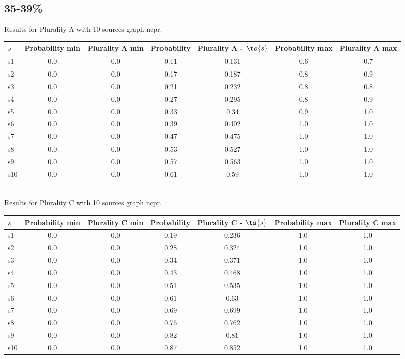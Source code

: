 \documentclass{article}
\begin{document}
\newpage

\subsection{35-39\%}

\noindent Results for Plurality A with 10 sources graph ncpr.

\noindent\begin{tabular}{|l|c|c|c|c|c|c|}
\hline
$s$& Probability min & Plurality A min & Probability & Plurality A - $\ts{s}$ & Probability max & Plurality A max\\
\hline
s1 &0.0 & 0.0 & 0.11 & 0.131 & 0.6 & 0.7\\
\hline
s2 &0.0 & 0.0 & 0.17 & 0.187 & 0.8 & 0.9\\
\hline
s3 &0.0 & 0.0 & 0.21 & 0.232 & 0.8 & 0.8\\
\hline
s4 &0.0 & 0.0 & 0.27 & 0.295 & 0.8 & 0.9\\
\hline
s5 &0.0 & 0.0 & 0.33 & 0.34 & 0.9 & 1.0\\
\hline
s6 &0.0 & 0.0 & 0.39 & 0.402 & 1.0 & 1.0\\
\hline
s7 &0.0 & 0.0 & 0.47 & 0.475 & 1.0 & 1.0\\
\hline
s8 &0.0 & 0.0 & 0.53 & 0.527 & 1.0 & 1.0\\
\hline
s9 &0.0 & 0.0 & 0.57 & 0.563 & 1.0 & 1.0\\
\hline
s10 &0.0 & 0.0 & 0.61 & 0.59 & 1.0 & 1.0\\
\hline
\end{tabular}\\

\noindent Results for Plurality C with 10 sources graph ncpr.

\noindent\begin{tabular}{|l|c|c|c|c|c|c|}
\hline
$s$& Probability min & Plurality C min & Probability & Plurality C - $\ts{s}$ & Probability max & Plurality C max\\
\hline
s1 &0.0 & 0.0 & 0.19 & 0.236 & 1.0 & 1.0\\
\hline
s2 &0.0 & 0.0 & 0.28 & 0.324 & 1.0 & 1.0\\
\hline
s3 &0.0 & 0.0 & 0.34 & 0.371 & 1.0 & 1.0\\
\hline
s4 &0.0 & 0.0 & 0.43 & 0.468 & 1.0 & 1.0\\
\hline
s5 &0.0 & 0.0 & 0.51 & 0.535 & 1.0 & 1.0\\
\hline
s6 &0.0 & 0.0 & 0.61 & 0.63 & 1.0 & 1.0\\
\hline
s7 &0.0 & 0.0 & 0.69 & 0.699 & 1.0 & 1.0\\
\hline
s8 &0.0 & 0.0 & 0.76 & 0.762 & 1.0 & 1.0\\
\hline
s9 &0.0 & 0.0 & 0.82 & 0.81 & 1.0 & 1.0\\
\hline
s10 &0.0 & 0.0 & 0.87 & 0.852 & 1.0 & 1.0\\
\hline
\end{tabular}\\
\end{document}

